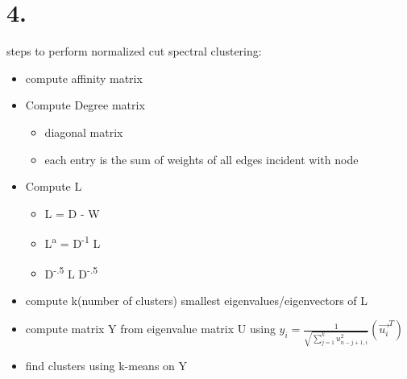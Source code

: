 \documentclass[11pt]{article}
\begin{document}
\section*{4.}
\label{sec:org6700a32}
steps to perform normalized cut spectral clustering:

\begin{itemize}
\item compute affinity matrix
\item Compute Degree matrix
\begin{itemize}
\item diagonal matrix
\item each entry is the sum of weights of all edges incident with node
\end{itemize}
\item Compute L
\begin{itemize}
\item L = D - W
\item L\textsuperscript{a} = D\textsuperscript{-1} L
\item D\textsuperscript{-.5} L D\textsuperscript{-.5}
\end{itemize}
\item compute k(number of clusters) smallest eigenvalues/eigenvectors of L
\item compute matrix Y from eigenvalue matrix U using \(y_i =
  \frac{1}{\sqrt{\sum^k_{j=1}u^2_{n-j+1, i}}}(\vec{u_i}^T)\)
\item find clusters using k-means on Y
\end{itemize}
\end{document}
